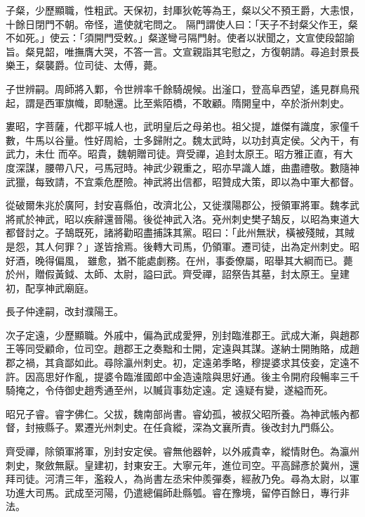 \begin{pinyinscope}
 子粲，少歷顯職，性粗武。天保初，封厙狄乾等為王，粲以父不預王爵，大恚恨，十餘日閉門不朝。帝怪，遣使就宅問之。
 隔門謂使人曰：「天子不封粲父作王，粲不如死。」使云：「須開門受敕。」粲遂彎弓隔門射。使者以狀聞之，文宣使段韶諭旨。粲見韶，唯撫膺大哭，不答一言。文宣親詣其宅慰之，方復朝請。尋追封景長樂王，粲襲爵。位司徒、太傅，薨。



 子世辨嗣。周師將入鄴，令世辨率千餘騎覘候。出滏口，登高阜西望，遙見群鳥飛起，謂是西軍旗幟，即馳還。比至紫陌橋，不敢顧。隋開皇中，卒於浙州刺史。



 婁昭，字菩薩，代郡平城人也，武明皇后之母弟也。祖父提，雄傑有識度，家僮千數，牛馬以谷量。性好周給，士多歸附之。魏太武時，以功封真定侯。父內干，有武力，未仕
 而卒。昭貴，魏朝贈司徒。齊受禪，追封太原王。昭方雅正直，有大度深謀，腰帶八尺，弓馬冠時。神武少親重之，昭亦早識人雄，曲盡禮敬。數隨神武獵，每致請，不宜乘危歷險。神武將出信都，昭贊成大策，即以為中軍大都督。



 從破爾朱兆於廣阿，封安喜縣伯，改濟北公，又徙濮陽郡公，授領軍將軍。魏孝武將貳於神武，昭以疾辭還晉陽。後從神武入洛。兗州刺史樊子鵠反，以昭為東道大都督討之。子鵠既死，諸將勸昭盡捕誅其黨。昭曰：「此州無狀，橫被殘賊，其賊是怨，其人何罪？」遂皆捨焉。後轉大司馬，仍領軍。遷司徒，出為定州刺史。昭好酒，晚得偏風，
 雖愈，猶不能處劇務。在州，事委僚屬，昭舉其大綱而已。薨於州，贈假黃鉞、太師、太尉，謚曰武。齊受禪，詔祭告其墓，封太原王。皇建初，配享神武廟庭。



 長子仲達嗣，改封濮陽王。



 次子定遠，少歷顯職。外戚中，偏為武成愛狎，別封臨淮郡王。武成大漸，與趙郡王等同受顧命，位司空。趙郡王之奏黜和士開，定遠與其謀。遂納士開賄賂，成趙郡之禍，其貪鄙如此。尋除瀛州刺史。初，定遠弟季略，穆提婆求其伎妾，定遠不許。因高思好作亂，提婆令臨淮國郎中金造遠陰與思好通。後主令開府段暢率三千騎掩之，令侍御史趙秀通至州，以贓貨事劾定遠。定
 遠疑有變，遂縊而死。



 昭兄子睿。睿字佛仁。父拔，魏南部尚書。睿幼孤，被叔父昭所養。為神武帳內都督，封掖縣子。累遷光州刺史。在任貪縱，深為文襄所責。後改封九門縣公。



 齊受禪，除領軍將軍，別封安定侯。睿無他器幹，以外戚貴幸，縱情財色。為瀛州刺史，聚斂無厭。皇建初，封東安王。大寧元年，進位司空。平高歸彥於冀州，還拜司徒。河清三年，濫殺人，為尚書左丞宋仲羨彈奏，經赦乃免。尋為太尉，以軍功進大司馬。武成至河陽，仍遣總偏師赴縣瓠。睿在豫境，留停百餘日，專行非法。




\end{pinyinscope}
